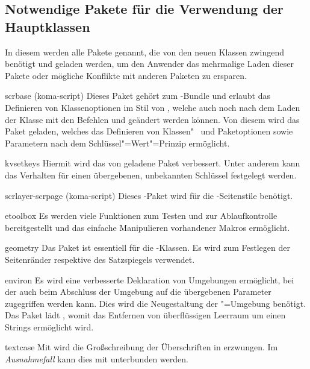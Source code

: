 \subsection{Notwendige Pakete für die Verwendung der Hauptklassen}
In diesem \autorefname werden alle Pakete genannt, die von den neuen Klassen 
zwingend benötigt und geladen werden, um den Anwender das mehrmalige Laden 
dieser Pakete oder mögliche Konflikte mit anderen Paketen zu ersparen.
%
\begin{packages}
\item[scrbase](koma-script)
  Dieses Paket gehört zum \KOMAScript-Bundle und erlaubt das Definieren von 
  Klassenoptionen im Stil von \KOMAScript, welche auch noch nach dem Laden der 
  Klasse mit den Befehlen  und  geändert 
  werden können. Von diesem wird das Paket  geladen, welches 
  das Definieren von Klassen"~ und Paketoptionen sowie Parametern nach dem 
  Schlüssel"=Wert"=Prinzip ermöglicht.
\item[kvsetkeys]
  Hiermit wird das von  geladene Paket  
  verbessert. Unter anderem kann das Verhalten für einen übergebenen, 
  unbekannten Schlüssel festgelegt werden.
\item[scrlayer-scrpage](koma-script)
  Dieses \KOMAScript-Paket wird für die -Seitenstile 
  benötigt.
\item[etoolbox]
  Es werden viele Funktionen zum Testen und zur Ablaufkontrolle bereitgestellt 
  und das einfache Manipulieren vorhandener Makros ermöglicht.
\item[geometry]
  Das Paket ist essentiell für die \TUDScript-Klassen. Es wird zum Festlegen 
  der Seitenränder respektive des Satzspiegels verwendet.
\item[environ]
  Es wird eine verbesserte Deklaration von Umgebungen ermöglicht, bei der auch 
  beim Abschluss der Umgebung auf die übergebenen Parameter zugegriffen werden 
  kann. Dies wird die Neugestaltung der "=Umgebung 
  benötigt. Das Paket lädt , womit das Entfernen von 
  überflüssigen Leerraum um einen Strings ermöglicht wird.
\item[textcase]
  Mit  wird die Großschreibung der Überschriften in 
  \DIN erzwungen. Im \emph{Ausnahmefall} kann dies mit  
  unterbunden werden.

\end{packages}
